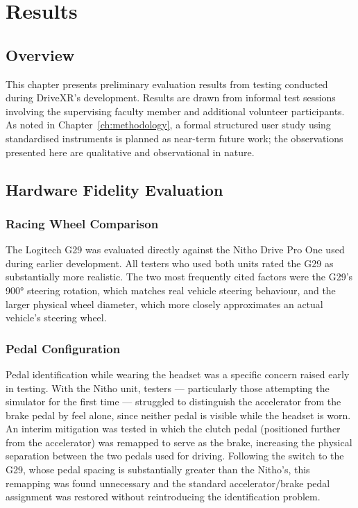 \chapter{Results}
\label{ch:results}

\section{Overview}
This chapter presents preliminary evaluation results from testing conducted during DriveXR's development. Results are drawn from informal test sessions involving the supervising faculty member and additional volunteer participants. As noted in Chapter~\ref{ch:methodology}, a formal structured user study using standardised instruments is planned as near-term future work; the observations presented here are qualitative and observational in nature.

\section{Hardware Fidelity Evaluation}

\subsection{Racing Wheel Comparison}
The Logitech G29 was evaluated directly against the Nitho Drive Pro One used during earlier development. All testers who used both units rated the G29 as substantially more realistic. The two most frequently cited factors were the G29's 900° steering rotation, which matches real vehicle steering behaviour, and the larger physical wheel diameter, which more closely approximates an actual vehicle's steering wheel.

\subsection{Pedal Configuration}
Pedal identification while wearing the headset was a specific concern raised early in testing. With the Nitho unit, testers — particularly those attempting the simulator for the first time — struggled to distinguish the accelerator from the brake pedal by feel alone, since neither pedal is visible while the headset is worn. An interim mitigation was tested in which the clutch pedal (positioned further from the accelerator) was remapped to serve as the brake, increasing the physical separation between the two pedals used for driving. Following the switch to the G29, whose pedal spacing is substantially greater than the Nitho's, this remapping was found unnecessary and the standard accelerator/brake pedal assignment was restored without reintroducing the identification problem.

